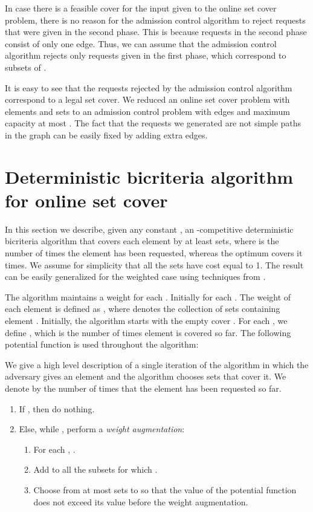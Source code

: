 \documentclass{sig-alternate}
\begin{document}
In case there is a feasible cover for the input given to the
online set cover problem, there is no reason for the admission
control algorithm to reject requests that were given in the second
phase. This is because requests in the second phase consist of
only one edge. Thus, we can assume that the admission control
algorithm rejects only requests given in the first phase, which
correspond to subsets of .

It is easy to see that the requests rejected by the admission
control algorithm correspond to a legal set cover. We reduced an
online set cover problem with  elements and  sets to an
admission control problem with  edges and maximum capacity at
most . The fact that the requests we generated are not simple
paths in the graph can be easily fixed by adding extra edges.

\section{Deterministic bicriteria algorithm for online set cover}\label{sec:det}

In this section we describe, given any constant , an
-competitive deterministic bicriteria algorithm
that covers each element by at least  sets, where
 is the number of times the element has been requested, whereas
the optimum covers it  times. We assume for simplicity that all
the sets have cost equal to 1. The result can be easily
generalized for the weighted case using techniques from
\cite{AAABN03}.

The algorithm maintains a weight  for each .
Initially  for each . The weight of each
element  is defined as ,
where  denotes the collection of sets containing element
. Initially, the algorithm starts with the empty cover . For each , we define , which is the number of times element  is covered
so far. The following potential function is used throughout the
algorithm:



We give a high level description of a single iteration of the
algorithm in which the adversary gives an element  and the
algorithm chooses sets that cover it. We denote by  the number
of times that the element  has been requested so far.

\begin{enumerate}
    \item If , then do nothing.
    \item Else, while , perform a {\em weight augmentation}:
    \begin{enumerate}
        \item For each , .\label{detalg1}
        \item Add to  all the subsets for which .\label{detalg2}
        \item Choose from  at most  sets to \label{detalg3}
        so that the value of the potential function  does
        not exceed its value before the weight augmentation.
    \end{enumerate}
\end{enumerate}
\end{document}
